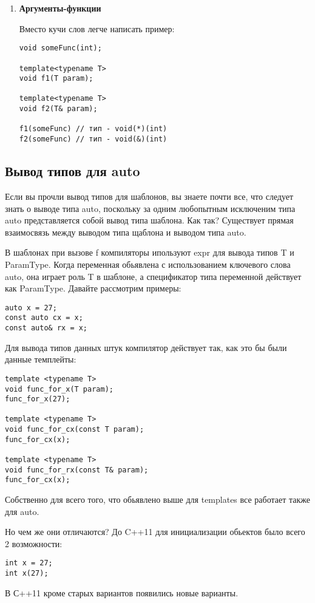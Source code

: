 \begin{enumerate}
				\item \textbf{Аргументы-функции}
				
				Вместо кучи слов легче написать пример:
\begin{verbatim}
void someFunc(int);

template<typename T>
void f1(T param);

template<typename T>
void f2(T& param);

f1(someFunc) // тип - void(*)(int)
f2(someFunc) // тип - void(&)(int)
\end{verbatim}
\end{enumerate}
	
	\subsection{Вывод типов для auto}
	Если вы прочли вывод типов для шаблонов, вы знаете почти все, что следует знать о выводе типа auto, поскольку за одним любопытным исключеним типа auto представляется собой вывод типа шаблона. Как так? Существует прямая взаимосвязь между выводом типа щаблона и выводом типа auto.
	
	В шаблонах при вызове f компиляторы ипользуют expr для вывода типов T и ParamType. Когда переменная обьявлена с использованием ключевого слова auto, она играет роль T в шаблоне, а спецификатор типа переменной действует как ParamType.
	Давайте рассмотрим примеры:
\begin{verbatim}
auto x = 27;
const auto cx = x;
const auto& rx = x;
\end{verbatim}

	Для вывода типов данных штук компилятор действует так, как это бы были данные темплейты:
	
\begin{verbatim}
template <typename T>
void func_for_x(T param);
func_for_x(27);

template <typename T>
void func_for_cx(const T param);
func_for_cx(x);

template <typename T>
void func_for_rx(const T& param);
func_for_cx(x);
\end{verbatim}

	Собственно для всего того, что обьявлено выше для templates все работает также для auto.
	
	Но чем же они отличаются? До C++11 для инициализации обьектов было всего 2 возможности:
\begin{verbatim}
int x = 27;
int x(27);
\end{verbatim}
	В С++11 кроме старых вариантов появились новые варианты.
	
